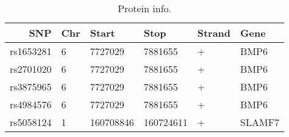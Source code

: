 \begin{table}[ht]
\centering
\begin{tabular}{rlllll}
  \hline
  SNP       & Chr & Start     & Stop      & Strand & Gene \\
  \hline
  rs1653281 & 6   & 7727029   & 7881655   & +      & BMP6 \\
  rs2701020 & 6   & 7727029   & 7881655   & +      & BMP6 \\
  rs3875965 & 6   & 7727029   & 7881655   & +      & BMP6 \\
  rs4984576 & 6   & 7727029   & 7881655   & +      & BMP6 \\
  rs5058124 & 1   & 160708846 & 160724611 & +      & SLAMF7 \\
  \hline
\end{tabular}
\caption{
  Protein info.
} 
\label{tab:protein_info}
\end{table}
